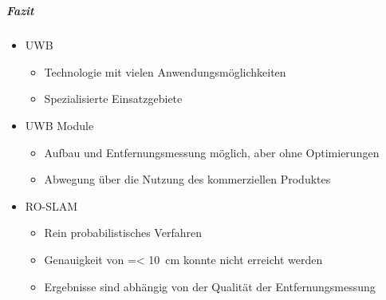 \documentclass{beamer}
\begin{document}
%
% 
%


%
%
\part{}
\begin{frame}
	\frametitle{Fazit}
	\begin{itemize}
		\item<1-> UWB
			\begin{itemize}
				\item Technologie mit vielen Anwendungsmöglichkeiten
				\item Spezialisierte Einsatzgebiete
			\end{itemize}
		\item<2-> UWB Module
			\begin{itemize}
				\item Aufbau und Entfernungsmessung möglich, aber ohne Optimierungen
				\item Abwegung über die Nutzung des kommerziellen Produktes
			\end{itemize}
		\item<3-> RO-SLAM
			\begin{itemize}
				\item Rein probabilistisches Verfahren
				\item Genauigkeit von =< \SI{10}{\centi\meter} konnte nicht erreicht werden
				\item Ergebnisse sind abhängig von der Qualität der Entfernungsmessung
			\end{itemize}
	\end{itemize}
\end{frame}
\end{document}
